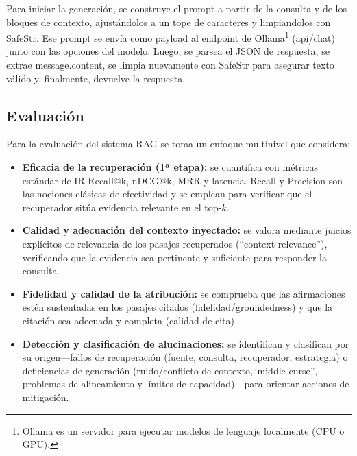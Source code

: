 Para iniciar la generación, se construye el prompt a partir de la consulta y de los bloques de contexto, ajustándolos a un tope de caracteres y limpiandolos con SafeStr. 
Ese prompt se envía como payload al endpoint de Ollama\footnote{Ollama es un servidor para ejecutar modelos de lenguaje localmente (CPU o GPU).} 
(api/chat) junto con las opciones del modelo. Luego, se parsea el JSON de respuesta, se extrae message.content, se limpia nuevamente con SafeStr para asegurar texto válido 
y, finalmente, devuelve la respuesta.


\subsection{Evaluación}
Para la evaluación del sistema RAG se toma un enfoque multinivel que  considera:
\begin{itemize}
    \item \textbf{Eficacia de la recuperación (1ª etapa):} se cuantifica con métricas estándar de IR Recall@k,
    nDCG@k, MRR y latencia.
    Recall y Precision son las nociones clásicas de efectividad y se emplean para
    verificar que el recuperador sitúa evidencia relevante en el top-$k$.

    \item \textbf{Calidad y adecuación del contexto inyectado:} se valora mediante juicios explícitos de relevancia
    de los pasajes recuperados (“context relevance”), verificando que la evidencia sea pertinente y suficiente
    para responder la consulta

    \item \textbf{Fidelidad y calidad de la atribución:} se comprueba que las afirmaciones estén sustentadas en los
    pasajes citados (fidelidad/groundedness) y que la citación sea adecuada y completa (calidad de cita)

    \item \textbf{Detección y clasificación de alucinaciones:} se identifican y clasifican por su origen—fallos de
    recuperación (fuente, consulta, recuperador, estrategia) o deficiencias de generación (ruido/conflicto de
    contexto,“middle curse”, problemas de alineamiento y límites de capacidad)—para orientar acciones de mitigación.
\end{itemize}


